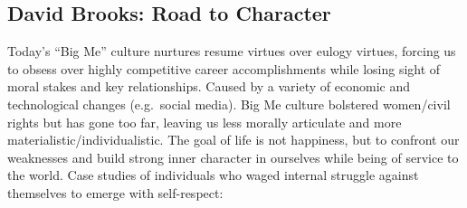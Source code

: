 \documentclass[
]{article}
\begin{document}
\hypertarget{david-brooks-road-to-character}{%
\subsection{David Brooks: Road to
Character}\label{david-brooks-road-to-character}}

Today's ``Big Me'' culture nurtures resume virtues over eulogy virtues,
forcing us to obsess over highly competitive career accomplishments
while losing sight of moral stakes and key relationships. Caused by a
variety of economic and technological changes (e.g.~social media). Big
Me culture bolstered women/civil rights but has gone too far, leaving us
less morally articulate and more materialistic/individualistic. The goal
of life is not happiness, but to confront our weaknesses and build
strong inner character in ourselves while being of service to the world.
Case studies of individuals who waged internal struggle against
themselves to emerge with self-respect:
\end{document}
